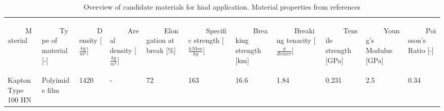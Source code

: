 \begin{table}[H]
\caption{Overview of candidate materials for \gls{hiad} application. Material properties from references \cite{Samareh2011,Miller2014}}
\vspace{41mm}
\hspace{-17mm}
\begin{tabular}{p{}|p{}|p{}|p{}|p{}|p{}|p{}|p{}|p{}|p{}|p{}|}
\begin{rotate}{60} ~~~~~Material \end{rotate}  &  \begin{rotate}{60} ~~~~~Type of material {[}-{]}  \end{rotate} & \begin{rotate}{60} ~~~~~Density [$\frac{kg}{m^3}$] \end{rotate}& \begin{rotate}{60} ~~~~~Areal density [$\frac{kg}{m^2}$] \end{rotate} & \begin{rotate}{60} ~~~~~Elongation at break [$\%$] \end{rotate} & \begin{rotate}{60} ~~~~~Specific strength [$\frac{kN km}{kg}$]\end{rotate} &  \begin{rotate}{60} ~~~~~Breaking strength [km]\end{rotate} & \begin{rotate}{60} ~~~~~Breaking tenacity [$\frac{g}{denier}$]\end{rotate}&  \begin{rotate}{60} ~~~~~Tensile strength [GPa] \end{rotate} & \begin{rotate}{60} ~~~~~Young's Modulus [GPa] \end{rotate} & \begin{rotate}{60} ~~~~~Poisson's Ratio [-] \end{rotate} \\
Kapton Type 100 HN           & Polyimide film               & 1420                                 & -                                          & 72                           & 163                              & 16.6                       & 1.84                             & 0.231                      & 2.5                       & 0.34                 \\ \hline

\end{tabular}
\end{table}
